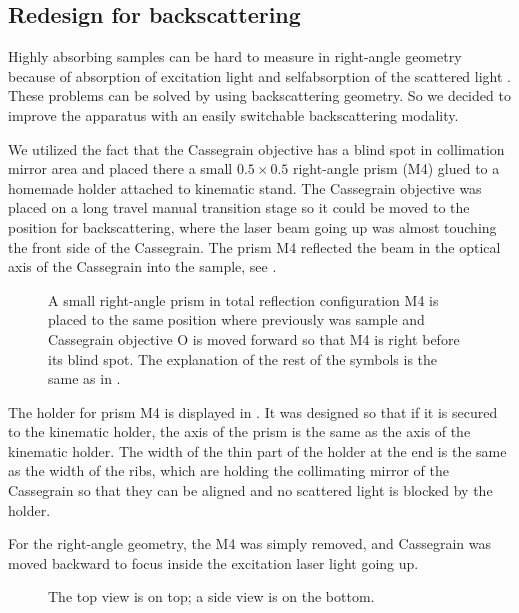 \subsection{Redesign for backscattering}

Highly absorbing samples can be hard to measure in right-angle geometry
because of absorption of excitation light and selfabsorption of the scattered
light \parencite{Shriver1974}.
These problems can be solved by using backscattering geometry.
So we decided to improve the apparatus with an easily switchable
backscattering modality.

We utilized the fact that the Cassegrain objective has a blind spot in
collimation mirror area and placed there a small $0.5 \times 0.5$ right-angle
prism (M4) glued to a homemade holder attached to kinematic stand.
The Cassegrain objective was placed on a long travel manual transition stage so
it could be moved to the position for backscattering, where the laser beam
going up was almost touching the front side of the Cassegrain.
The prism M4 reflected the beam in the optical axis of the Cassegrain into the
sample, see
.

\begin{figure}
	\centering
	
	\caption[%
		Top-view schema of the apparatus in backscattering configuration
		and with side-view inset of the sample space.%
	]{%
		A small right-angle prism in total reflection configuration M4 is placed to
		the same position where previously was sample and Cassegrain objective O is
		moved forward so that M4 is right before its blind spot.
		The explanation of the rest of the symbols is the same as in
		.
	}
	\label{\figlabel{backscattering:apparatus_schema}}
\end{figure}

The holder for prism M4 is displayed in
.
It was designed so that if it is secured to the kinematic holder, the axis of
the prism is the same as the axis of the kinematic holder.
The width of the thin part of the holder at the end is the same as the width of
the ribs, which are holding the collimating mirror of the Cassegrain so that
they can be aligned and no scattered light is blocked by the holder.

For the right-angle geometry, the M4 was simply removed, and Cassegrain was
moved backward to focus inside the excitation laser light going up.

\begin{figure}
	\centering
	
	\caption[%
		Backscattering holder.%
	]{%
		The top view is on top; a side view is on the bottom.
	}
	\label{\figlabel{backscattering_holder:drawing}}
\end{figure}

